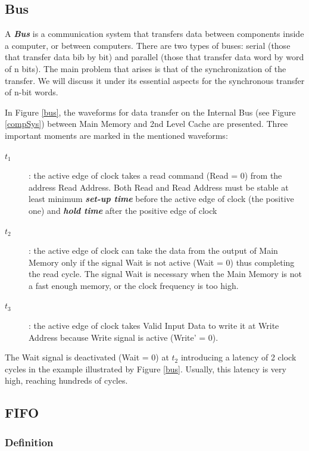 \subsection{Bus}

A {\bf {\em Bus}} is a communication system that transfers data between components inside a computer, or between computers. There are two types of buses: serial (those that transfer data bib by bit) and parallel (those that transfer data word by word of n bits). The main problem that arises is that of the synchronization of the transfer. We will discuss it under its essential aspects for the synchronous transfer of n-bit words.

In Figure \ref{bus}, the waveforms for data transfer on the Internal Bus (see Figure \ref{compSys}) between Main Memory and 2nd Level Cache are presented. Three important moments are marked in the mentioned waveforms:
\begin{description}
    \item[$t_1$]: the active edge of clock takes a read command (Read = 0) from the address Read Address. Both Read and Read Address must be stable at least minimum {\bf {\em  set-up time}} before the active edge of clock (the positive one) and {\bf {\em hold time}} after the positive edge of clock
    \item[$t_2$]: the active edge of clock can take the data from the output of Main Memory only if the signal Wait is not active (Wait = 0) thus completing the read cycle. The signal Wait is necessary when the Main Memory is not a fast enough memory, or the clock frequency is too high.
    \item[$t_3$]: the active edge of clock takes Valid Input Data to write it at Write Address because Write signal is active (Write' = 0).
\end{description}


The Wait signal is deactivated (Wait = 0) at $t_2$ introducing a latency of 2 clock cycles in the example illustrated by Figure \ref{bus}. Usually, this latency is very high, reaching hundreds of cycles.


\subsection{FIFO}

\subsubsection{Definition}

